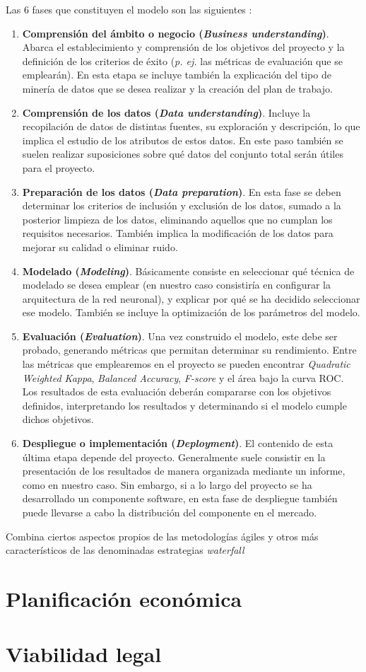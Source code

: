 Las 6 fases que constituyen el modelo son las siguientes \cite{crispdm:niaksu,crispdm:schorer}:
\begin{enumerate}[itemsep=0.1em]
    \item \textbf{Comprensión del ámbito o negocio (\textit{Business understanding})}. Abarca el establecimiento y comprensión de los objetivos del proyecto y la definición de los criterios de éxito (\textit{p. ej.} las métricas de evaluación que se emplearán). En esta etapa se incluye también la explicación del tipo de minería de datos que se desea realizar y la creación del plan de trabajo.
    \item \textbf{Comprensión de los datos (\textit{Data understanding})}. Incluye la recopilación de datos de distintas fuentes, su exploración y descripción, lo que implica el estudio de los atributos de estos datos. En este paso también se suelen realizar suposiciones sobre qué datos del conjunto total serán útiles para el proyecto.
    \item \textbf{Preparación de los datos (\textit{Data preparation})}. En esta fase se deben determinar los criterios de inclusión y exclusión de los datos, sumado a la posterior limpieza de los datos, eliminando aquellos que no cumplan los requisitos necesarios. También implica la modificación de los datos para mejorar su calidad o eliminar ruido.
    \item \textbf{Modelado (\textit{Modeling})}. Básicamente consiste en seleccionar qué técnica de modelado se desea emplear (en nuestro caso consistiría en configurar la arquitectura de la red neuronal), y explicar por qué se ha decidido seleccionar ese modelo. También se incluye la optimización de los parámetros del modelo.
    \item \textbf{Evaluación (\textit{Evaluation})}. Una vez construido el modelo, este debe ser probado, generando métricas que permitan determinar su rendimiento. Entre las métricas que emplearemos en el proyecto se pueden encontrar \textit{Quadratic Weighted Kappa}, \textit{Balanced Accuracy}, \textit{F-score} y el área bajo la curva ROC. Los resultados de esta evaluación deberán compararse con los objetivos definidos, interpretando los resultados y determinando si el modelo cumple dichos objetivos.
    \item \textbf{Despliegue o implementación (\textit{Deployment})}. El contenido de esta última etapa depende del proyecto. Generalmente suele consistir en la presentación de los resultados de manera organizada mediante un informe, como en nuestro caso. Sin embargo, si a lo largo del proyecto se ha desarrollado un componente software, en esta fase de despliegue también puede llevarse a cabo la distribución del componente en el mercado.
\end{enumerate}



Combina ciertos aspectos propios de las metodologías ágiles y otros más característicos de las denominadas estrategias \textit{waterfall}

\section{Planificación económica}

\section{Viabilidad legal}
